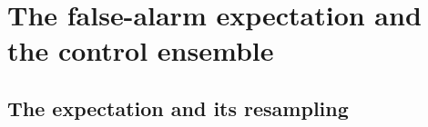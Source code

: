 \section{The false-alarm expectation and the control ensemble}
\label{app:falsealarm}

\subsection{The expectation and its resampling}

